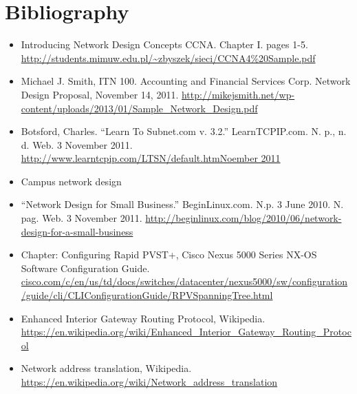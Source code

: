 \documentclass[ a4, 12pt, onecolumn]{IEEEtran}
\begin{document}
\section{Bibliography}
\label{sec:bib}
\begin{itemize}
\item Introducing Network Design Concepts CCNA. Chapter I. pages 1-5. \url{http://students.mimuw.edu.pl/~zbyszek/sieci/CCNA4%20Sample.pdf}

\item Michael J. Smith, ITN 100. Accounting and Financial Services Corp. Network Design Proposal, November 14, 2011. \url{http://mikejsmith.net/wp-content/uploads/2013/01/Sample_Network_Design.pdf}

\item Botsford, Charles. “Learn To Subnet.com v. 3.2.” LearnTCPIP.com. N. p., n. d. Web. 3 November 2011. \url{http://www.learntcpip.com/LTSN/default.htmNoember 2011}
\item Campus network design 

\item “Network Design for Small Business.” BeginLinux.com. N.p. 3 June 2010. N. pag. Web. 3 November 2011. \url{http://beginlinux.com/blog/2010/06/network-design-for-a-small-business}

\item Chapter: Configuring Rapid PVST+, Cisco Nexus 5000 Series NX-OS Software Configuration Guide. \url{cisco.com/c/en/us/td/docs/switches/datacenter/nexus5000/sw/configuration/guide/cli/CLIConfigurationGuide/RPVSpanningTree.html}

\item Enhanced Interior Gateway Routing Protocol, Wikipedia. \url{https://en.wikipedia.org/wiki/Enhanced_Interior_Gateway_Routing_Protocol}

\item Network address translation, Wikipedia. \url{https://en.wikipedia.org/wiki/Network_address_translation}
\end{itemize}	
\end{document}
